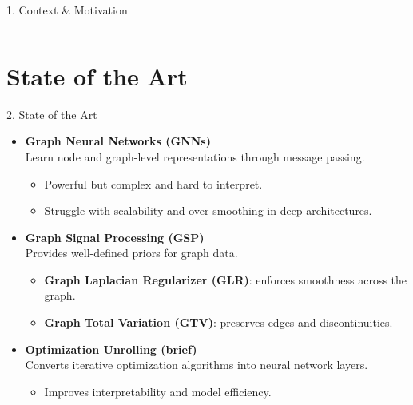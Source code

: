 \documentclass[aspectratio=169,xcolor=dvipsnames]{beamer}
\begin{document}
\begin{frame}{1. Context \& Motivation}
\begin{columns}[c]
    \end{columns}

\end{frame}

\section{State of the Art}

\begin{frame}{2. State of the Art}
    \begin{itemize}
        \item \textbf{Graph Neural Networks (GNNs)}  
        \\Learn node and graph-level representations through message passing.
        \begin{itemize}
            \item Powerful but complex and hard to interpret.
            \item Struggle with scalability and over-smoothing in deep architectures.
        \end{itemize}

        \vspace{0.4cm}
        \item \textbf{Graph Signal Processing (GSP)}  
        \\Provides well-defined priors for graph data.
        \begin{itemize}
            \item \textbf{Graph Laplacian Regularizer (GLR)}: enforces smoothness across the graph. \cite{ortega2018graph}
            \item \textbf{Graph Total Variation (GTV)}: preserves edges and discontinuities. \cite{cheung2018graph}
        \end{itemize}

        \vspace{0.4cm}
        \item \textbf{Optimization Unrolling (brief)}  
        \\Converts iterative optimization algorithms into neural network layers.
        \begin{itemize}
            \item Improves interpretability and model efficiency.
        \end{itemize}
    \end{itemize}
\end{frame}
\end{document}
